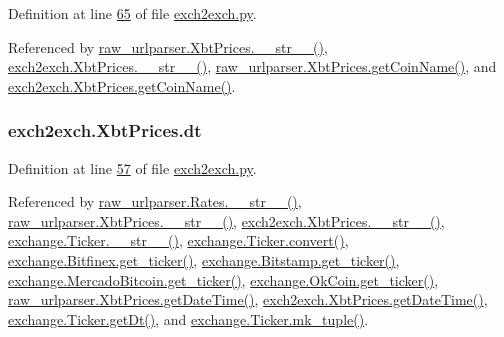 Definition at line \hyperlink{exch2exch_8py_source_l00065}{65} of file \hyperlink{exch2exch_8py_source}{exch2exch.\+py}.



Referenced by \hyperlink{raw__urlparser_8py_source_l00074}{raw\+\_\+urlparser.\+Xbt\+Prices.\+\_\+\+\_\+str\+\_\+\+\_\+()}, \hyperlink{exch2exch_8py_source_l00091}{exch2exch.\+Xbt\+Prices.\+\_\+\+\_\+str\+\_\+\+\_\+()}, \hyperlink{raw__urlparser_8py_source_l00071}{raw\+\_\+urlparser.\+Xbt\+Prices.\+get\+Coin\+Name()}, and \hyperlink{exch2exch_8py_source_l00088}{exch2exch.\+Xbt\+Prices.\+get\+Coin\+Name()}.

\subsubsection[{\texorpdfstring{dt}{dt}}]{\setlength{\rightskip}{0pt plus 5cm}exch2exch.\+Xbt\+Prices.\+dt}\hypertarget{classexch2exch_1_1_xbt_prices_af9f916c683c48631c97f1c5d91447751}{}\label{classexch2exch_1_1_xbt_prices_af9f916c683c48631c97f1c5d91447751}


Definition at line \hyperlink{exch2exch_8py_source_l00057}{57} of file \hyperlink{exch2exch_8py_source}{exch2exch.\+py}.



Referenced by \hyperlink{raw__urlparser_8py_source_l00038}{raw\+\_\+urlparser.\+Rates.\+\_\+\+\_\+str\+\_\+\+\_\+()}, \hyperlink{raw__urlparser_8py_source_l00074}{raw\+\_\+urlparser.\+Xbt\+Prices.\+\_\+\+\_\+str\+\_\+\+\_\+()}, \hyperlink{exch2exch_8py_source_l00091}{exch2exch.\+Xbt\+Prices.\+\_\+\+\_\+str\+\_\+\+\_\+()}, \hyperlink{exchange_8py_source_l00111}{exchange.\+Ticker.\+\_\+\+\_\+str\+\_\+\+\_\+()}, \hyperlink{exchange_8py_source_l00065}{exchange.\+Ticker.\+convert()}, \hyperlink{exchange_8py_source_l00340}{exchange.\+Bitfinex.\+get\+\_\+ticker()}, \hyperlink{exchange_8py_source_l00409}{exchange.\+Bitstamp.\+get\+\_\+ticker()}, \hyperlink{exchange_8py_source_l00543}{exchange.\+Mercado\+Bitcoin.\+get\+\_\+ticker()}, \hyperlink{exchange_8py_source_l00608}{exchange.\+Ok\+Coin.\+get\+\_\+ticker()}, \hyperlink{raw__urlparser_8py_source_l00059}{raw\+\_\+urlparser.\+Xbt\+Prices.\+get\+Date\+Time()}, \hyperlink{exch2exch_8py_source_l00067}{exch2exch.\+Xbt\+Prices.\+get\+Date\+Time()}, \hyperlink{exchange_8py_source_l00093}{exchange.\+Ticker.\+get\+Dt()}, and \hyperlink{exchange_8py_source_l00096}{exchange.\+Ticker.\+mk\+\_\+tuple()}.

